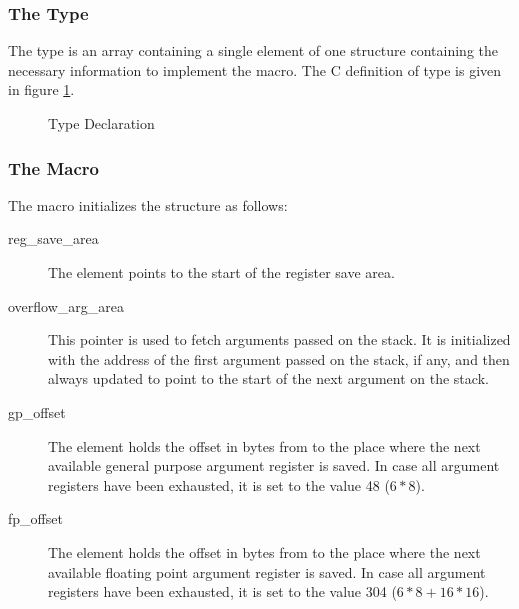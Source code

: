 \subsubsection{The  Type}

The  type is an array containing a single element of one
structure
containing the necessary information to implement the  macro. The C
definition of  type is given in figure \ref{fig-va_list}.

\begin{figure}[H]
\Hrule
\caption{ Type Declaration}
\label{fig-va_list}
\begin{center}
\end{center}
\Hrule
\end{figure}


\subsubsection{The  Macro}

The  macro initializes the structure as follows:

\begin{description}
\item [reg_save_area]
The element points to the start of the register save area.
\item [overflow_arg_area] This pointer is used to fetch arguments
  passed on the stack.  It is initialized with the address of the
  first argument passed on the stack, if any, and then always updated
  to point to the start of the next argument on the stack.
\item [gp_offset] The element holds the offset in bytes from
   to the place where the next available general
  purpose argument register is saved.  In case all argument registers
  have been exhausted, it is set to the value 48 ($6*8$).
\item [fp_offset]
The element holds the offset in bytes from  to the
place where the next available floating point
argument register is saved.  In case all argument registers have been exhausted,
it is set to the value 304 ($6*8+16*16$).
\end{description}

